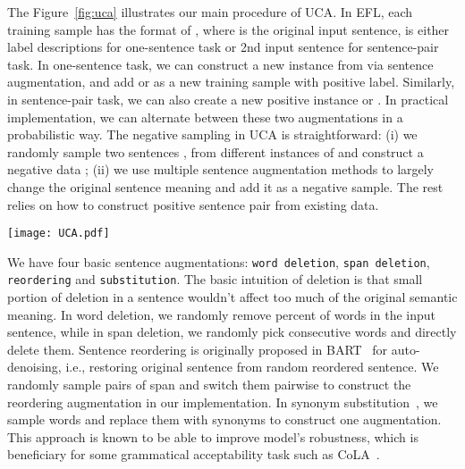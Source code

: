\documentclass{article}
\begin{document}
The Figure~\ref{fig:uca} illustrates our main procedure of UCA. In EFL, each training sample has the format of , where  is the original input sentence,  is either label descriptions for one-sentence task or 2nd input sentence for sentence-pair task. In one-sentence task, we can construct a new instance  from  via sentence augmentation, and add  or  as a new training sample with positive label. Similarly, in sentence-pair task, we can also create a new positive instance  or . In practical implementation, we can alternate between these two augmentations in a probabilistic way. The negative sampling in UCA is straightforward: (i) we randomly sample two sentences ,  from different instances of  and construct a negative data ; (ii) we use multiple sentence augmentation methods to largely change the original sentence meaning and add it as a negative sample. The rest relies on how to construct positive sentence pair from existing data.
\begin{figure*}[t]
  \centering
  \texttt{[image: UCA.pdf]}
  \caption{An illustration of our proposed unsupervised contrastive learning-based data augmentation method for entailment-based training.}
  \label{fig:uca}
\end{figure*}

We have four basic sentence augmentations: \texttt{word deletion}, \texttt{span deletion}, \texttt{reordering} and \texttt{substitution}. The basic intuition of deletion is that small portion of deletion in a sentence wouldn’t affect too much of the original semantic meaning. In word deletion, we randomly remove   percent of words in the input sentence, while in span deletion, we randomly pick  consecutive words and directly delete them. Sentence reordering is originally proposed in BART~\citep{lewis2020bart} for auto-denoising, i.e., restoring original sentence from random reordered sentence. We randomly sample  pairs of span and switch them pairwise to construct the reordering augmentation in our implementation. In synonym substitution~\citep{jia2019certified}, we sample  words and replace them with synonyms to construct one augmentation. This approach is known to be able to improve model’s robustness, which is beneficiary for some grammatical acceptability task such as CoLA~\citep{warstadt2019neural}.
\end{document}
